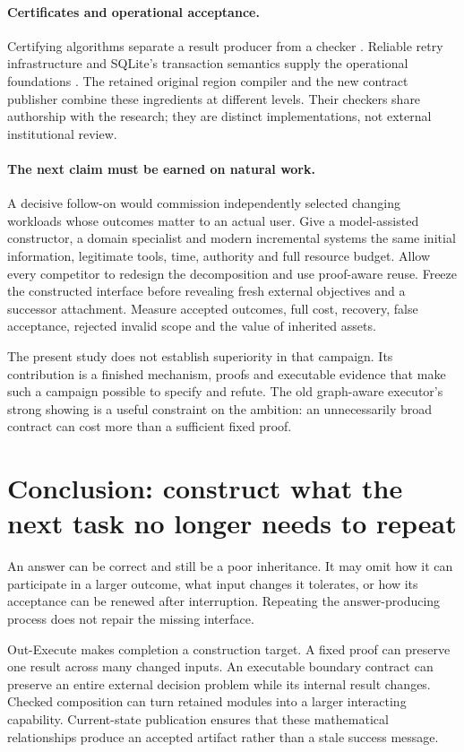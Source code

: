 \documentclass[11pt,letterpaper]{article}
\theoremstyle{definition}\newtheorem{definition}[theorem]{Definition}
\theoremstyle{remark}\newtheorem{remark}[theorem]{Remark}
\newcommand{\Out}{\textsf{Out-Execute}}
\newcommand{\phead}[1]{\Needspace{4\baselineskip}\paragraph{#1}}
\begin{document}
\phead{Certificates and operational acceptance.}
Certifying algorithms separate a result producer from a checker \citep{certifying}. Reliable retry infrastructure and SQLite's transaction semantics supply the operational foundations \citep{rifl,sqlite}. The retained original region compiler and the new contract publisher combine these ingredients at different levels. Their checkers share authorship with the research; they are distinct implementations, not external institutional review.

\phead{The next claim must be earned on natural work.}
A decisive follow-on would commission independently selected changing workloads whose outcomes matter to an actual user. Give a model-assisted constructor, a domain specialist and modern incremental systems the same initial information, legitimate tools, time, authority and full resource budget. Allow every competitor to redesign the decomposition and use proof-aware reuse. Freeze the constructed interface before revealing fresh external objectives and a successor attachment. Measure accepted outcomes, full cost, recovery, false acceptance, rejected invalid scope and the value of inherited assets.

The present study does not establish superiority in that campaign. Its contribution is a finished mechanism, proofs and executable evidence that make such a campaign possible to specify and refute. The old graph-aware executor's strong showing is a useful constraint on the ambition: an unnecessarily broad contract can cost more than a sufficient fixed proof.

\section{Conclusion: construct what the next task no longer needs to repeat}
An answer can be correct and still be a poor inheritance. It may omit how it can participate in a larger outcome, what input changes it tolerates, or how its acceptance can be renewed after interruption. Repeating the answer-producing process does not repair the missing interface.

\Out{} makes completion a construction target. A fixed proof can preserve one result across many changed inputs. An executable boundary contract can preserve an entire external decision problem while its internal result changes. Checked composition can turn retained modules into a larger interacting capability. Current-state publication ensures that these mathematical relationships produce an accepted artifact rather than a stale success message.
\end{document}
